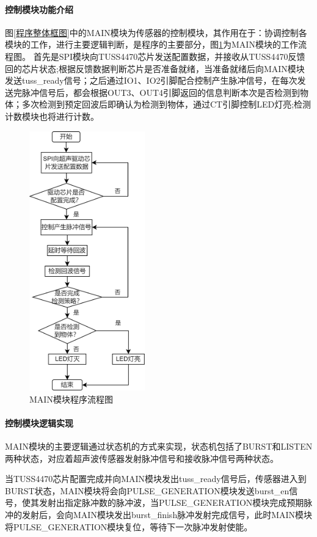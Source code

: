 \paragraph{控制模块功能介绍}
图\ref{程序整体框图}中的MAIN模块为传感器的控制模块，其作用在于：协调控制各模块的工作，进行主要逻辑判断，是程序的主要部分，图\ref{MAIN模块程序流程图}为MAIN模块的工作流程图。
首先是SPI模块向TUSS4470芯片发送配置数据，并接收从TUSS4470反馈回的芯片状态;根据反馈数据判断芯片是否准备就绪，当准备就绪后向MAIN模块发送tuss\_ready信号；之后通过IO1、IO2引脚配合控制产生脉冲信号，在每次发送完脉冲信号后，都会根据OUT3、OUT4引脚返回的信息判断本次是否检测到物体；多次检测到预定回波后即确认为检测到物体，通过CT引脚控制LED灯亮;检测计数模块也将进行计数。

\begin{figure}[ht]
	\centering
	\includegraphics[width=5cm]{figure/MAIN module flow chart.png}
	\caption{MAIN模块程序流程图}
	\label{MAIN模块程序流程图}
\end{figure}

\noindent
\paragraph{控制模块逻辑实现}
MAIN模块的主要逻辑通过状态机的方式来实现，状态机包括了BURST和LISTEN两种状态，对应着超声波传感器发射脉冲信号和接收脉冲信号两种状态。

当TUSS4470芯片配置完成并向MAIN模块发出tuss\_ready信号后，传感器进入到BURST状态，MAIN模块将会向PULSE\_GENERATION模块发送burst\_en信号，使其发射出指定脉冲数的脉冲波，当PULSE\_GENERATION模块完成预期脉冲的发射后，会向MAIN模块发出burst\_finish脉冲发射完成信号，此时MAIN模块将PULSE\_GENERATION模块复位，等待下一次脉冲发射使能。

